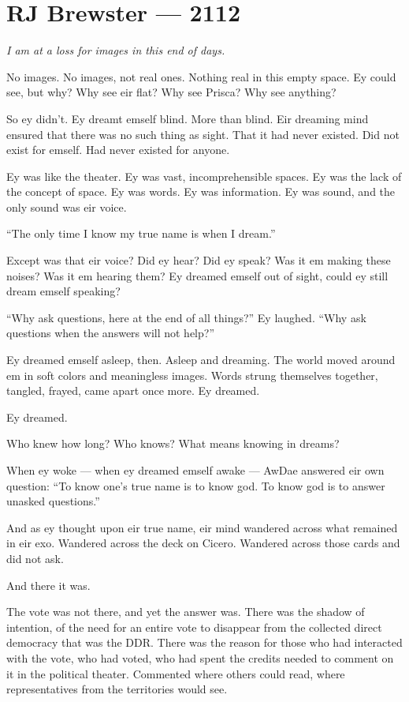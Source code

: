 \hypertarget{rj-brewster-2112}{%
\chapter*{RJ Brewster — 2112}\label{rj-brewster-2112}}

\emph{I am at a loss for images in this end of days.}

No images. No images, not real ones. Nothing real in this empty space. Ey could see, but why? Why see eir flat? Why see Prisca? Why see anything?

So ey didn't. Ey dreamt emself blind. More than blind. Eir dreaming mind ensured that there was no such thing as sight. That it had never existed. Did not exist for emself. Had never existed for anyone.

Ey was like the theater. Ey was vast, incomprehensible spaces. Ey was the lack of the concept of space. Ey was words. Ey was information. Ey was sound, and the only sound was eir voice.

``The only time I know my true name is when I dream.''

Except was that eir voice? Did ey hear? Did ey speak? Was it em making these noises? Was it em hearing them? Ey dreamed emself out of sight, could ey still dream emself speaking?

``Why ask questions, here at the end of all things?'' Ey laughed. ``Why ask questions when the answers will not help?''

Ey dreamed emself asleep, then. Asleep and dreaming. The world moved around em in soft colors and meaningless images. Words strung themselves together, tangled, frayed, came apart once more. Ey dreamed.

Ey dreamed.

Who knew how long? Who knows? What means knowing in dreams?

When ey woke — when ey dreamed emself awake — AwDae answered eir own question: ``To know one's true name is to know god. To know god is to answer unasked questions.''

And as ey thought upon eir true name, eir mind wandered across what remained in eir exo. Wandered across the deck on Cicero. Wandered across those cards and did not ask.

And there it was.

The vote was not there, and yet the answer was. There was the shadow of intention, of the need for an entire vote to disappear from the collected direct democracy that was the DDR. There was the reason for those who had interacted with the vote, who had voted, who had spent the credits needed to comment on it in the political theater. Commented where others could read, where representatives from the territories would see.

